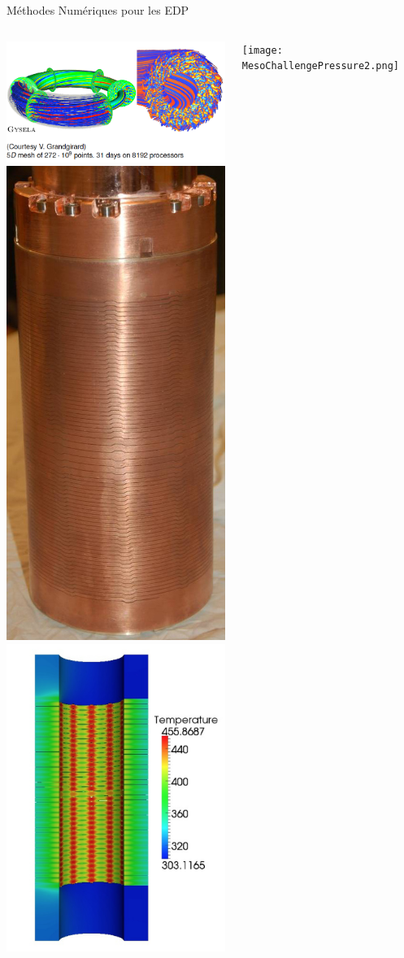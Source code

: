 \documentclass{beamer}
\begin{document}
\begin{frame}{M{\'e}thodes Num{\'e}riques pour les EDP}


  \begin{columns}
    \includegraphics[width=0.9\linewidth]{gysela.png}\\
    \includegraphics[width=0.4\linewidth]{Radial_magnet.jpg}
    \includegraphics[width=0.4\linewidth]{temperature.jpg}
    \centerline{\texttt{[image: MesoChallengePressure2.png]}}\\
  \end{columns}




\end{frame}
\end{document}
